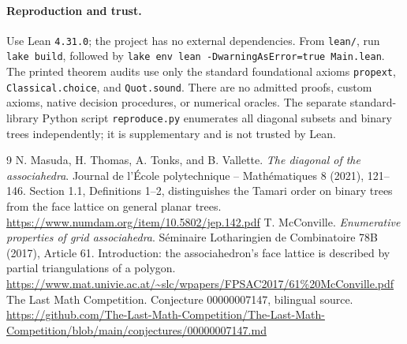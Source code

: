 \documentclass[10pt]{article}
\begin{document}
\paragraph{Reproduction and trust.}
Use Lean \texttt{4.31.0}; the project has no external dependencies. From \texttt{lean/}, run \texttt{lake build}, followed by \texttt{lake env lean -DwarningAsError=true Main.lean}. The printed theorem audits use only the standard foundational axioms \texttt{propext}, \texttt{Classical.choice}, and \texttt{Quot.sound}. There are no admitted proofs, custom axioms, native decision procedures, or numerical oracles. The separate standard-library Python script \texttt{reproduce.py} enumerates all diagonal subsets and binary trees independently; it is supplementary and is not trusted by Lean.

\begin{thebibliography}{9}
 N. Masuda, H. Thomas, A. Tonks, and B. Vallette.
\emph{The diagonal of the associahedra}. Journal de l'\'Ecole polytechnique -- Math\'ematiques 8 (2021), 121--146. Section 1.1, Definitions 1--2, distinguishes the Tamari order on binary trees from the face lattice on general planar trees.
\url{https://www.numdam.org/item/10.5802/jep.142.pdf}
 T. McConville. \emph{Enumerative properties of grid associahedra}.
S\'eminaire Lotharingien de Combinatoire 78B (2017), Article 61. Introduction: the associahedron's face lattice is described by partial triangulations of a polygon.
\url{https://www.mat.univie.ac.at/~slc/wpapers/FPSAC2017/61%20McConville.pdf}
 The Last Math Competition. Conjecture 00000007147, bilingual source.
\url{https://github.com/The-Last-Math-Competition/The-Last-Math-Competition/blob/main/conjectures/00000007147.md}
\end{thebibliography}
\end{document}
